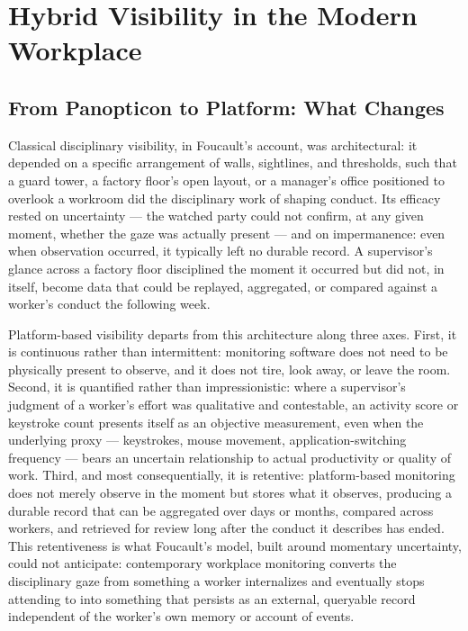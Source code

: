 \documentclass[12pt, a4paper]{article}
\begin{document}
\section{Hybrid Visibility in the Modern Workplace}

\subsection{From Panopticon to Platform: What Changes}

Classical disciplinary visibility, in Foucault's account, was architectural: it depended on a specific arrangement of walls, sightlines, and thresholds, such that a guard tower, a factory floor's open layout, or a manager's office positioned to overlook a workroom did the disciplinary work of shaping conduct. Its efficacy rested on uncertainty --- the watched party could not confirm, at any given moment, whether the gaze was actually present --- and on impermanence: even when observation occurred, it typically left no durable record. A supervisor's glance across a factory floor disciplined the moment it occurred but did not, in itself, become data that could be replayed, aggregated, or compared against a worker's conduct the following week.

Platform-based visibility departs from this architecture along three axes. First, it is continuous rather than intermittent: monitoring software does not need to be physically present to observe, and it does not tire, look away, or leave the room. Second, it is quantified rather than impressionistic: where a supervisor's judgment of a worker's effort was qualitative and contestable, an activity score or keystroke count presents itself as an objective measurement, even when the underlying proxy --- keystrokes, mouse movement, application-switching frequency --- bears an uncertain relationship to actual productivity or quality of work. Third, and most consequentially, it is retentive: platform-based monitoring does not merely observe in the moment but stores what it observes, producing a durable record that can be aggregated over days or months, compared across workers, and retrieved for review long after the conduct it describes has ended. This retentiveness is what Foucault's model, built around momentary uncertainty, could not anticipate: contemporary workplace monitoring converts the disciplinary gaze from something a worker internalizes and eventually stops attending to into something that persists as an external, queryable record independent of the worker's own memory or account of events.
\end{document}
